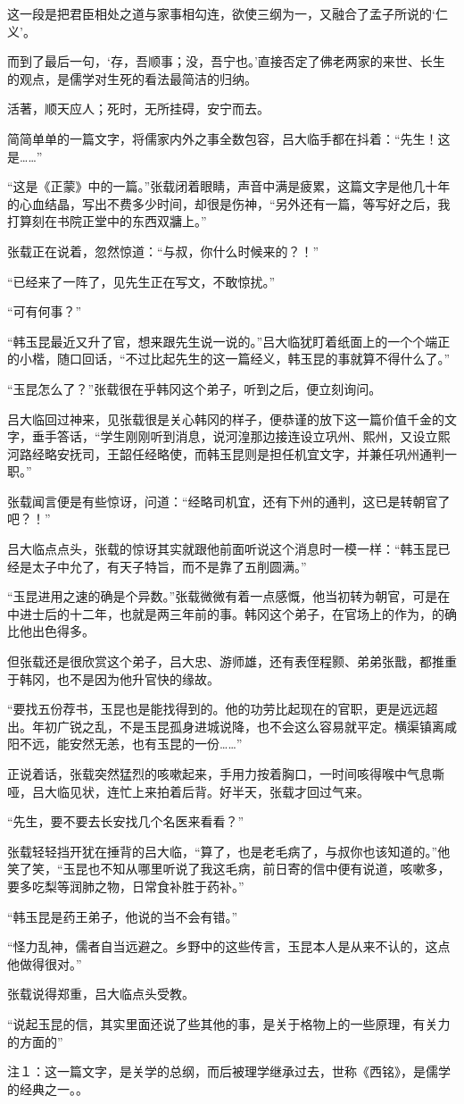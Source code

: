 这一段是把君臣相处之道与家事相勾连，欲使三纲为一，又融合了孟子所说的‘仁义’。

而到了最后一句，‘存，吾顺事；没，吾宁也。’直接否定了佛老两家的来世、长生的观点，是儒学对生死的看法最简洁的归纳。

活著，顺天应人；死时，无所挂碍，安宁而去。

简简单单的一篇文字，将儒家内外之事全数包容，吕大临手都在抖着：“先生！这是……”

“这是《正蒙》中的一篇。”张载闭着眼睛，声音中满是疲累，这篇文字是他几十年的心血结晶，写出不费多少时间，却很是伤神，“另外还有一篇，等写好之后，我打算刻在书院正堂中的东西双牅上。”

张载正在说着，忽然惊道：“与叔，你什么时候来的？！”

“已经来了一阵了，见先生正在写文，不敢惊扰。”

“可有何事？”

“韩玉昆最近又升了官，想来跟先生说一说的。”吕大临犹盯着纸面上的一个个端正的小楷，随口回话，“不过比起先生的这一篇经义，韩玉昆的事就算不得什么了。”

“玉昆怎么了？”张载很在乎韩冈这个弟子，听到之后，便立刻询问。

吕大临回过神来，见张载很是关心韩冈的样子，便恭谨的放下这一篇价值千金的文字，垂手答话，“学生刚刚听到消息，说河湟那边接连设立巩州、熙州，又设立熙河路经略安抚司，王韶任经略使，而韩玉昆则是担任机宜文字，并兼任巩州通判一职。”

张载闻言便是有些惊讶，问道：“经略司机宜，还有下州的通判，这已是转朝官了吧？！”

吕大临点点头，张载的惊讶其实就跟他前面听说这个消息时一模一样：“韩玉昆已经是太子中允了，有天子特旨，而不是靠了五削圆满。”

“玉昆进用之速的确是个异数。”张载微微有着一点感慨，他当初转为朝官，可是在中进士后的十二年，也就是两三年前的事。韩冈这个弟子，在官场上的作为，的确比他出色得多。

但张载还是很欣赏这个弟子，吕大忠、游师雄，还有表侄程颢、弟弟张戬，都推重于韩冈，也不是因为他升官快的缘故。

“要找五份荐书，玉昆也是能找得到的。他的功劳比起现在的官职，更是远远超出。年初广锐之乱，不是玉昆孤身进城说降，也不会这么容易就平定。横渠镇离咸阳不远，能安然无恙，也有玉昆的一份……”

正说着话，张载突然猛烈的咳嗽起来，手用力按着胸口，一时间咳得喉中气息嘶哑，吕大临见状，连忙上来拍着后背。好半天，张载才回过气来。

“先生，要不要去长安找几个名医来看看？”

张载轻轻挡开犹在捶背的吕大临，“算了，也是老毛病了，与叔你也该知道的。”他笑了笑，“玉昆也不知从哪里听说了我这毛病，前日寄的信中便有说道，咳嗽多，要多吃梨等润肺之物，日常食补胜于药补。”

“韩玉昆是药王弟子，他说的当不会有错。”

“怪力乱神，儒者自当远避之。乡野中的这些传言，玉昆本人是从来不认的，这点他做得很对。”

张载说得郑重，吕大临点头受教。

“说起玉昆的信，其实里面还说了些其他的事，是关于格物上的一些原理，有关力的方面的”

注１：这一篇文字，是关学的总纲，而后被理学继承过去，世称《西铭》，是儒学的经典之一。。

